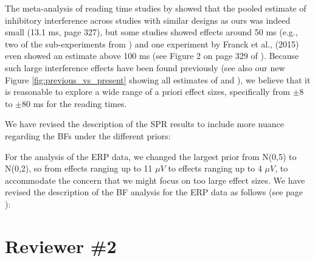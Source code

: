 \documentclass[12pt]{article}
\begin{document}
The meta-analysis of reading time studies by \textcite{jaeger_etal_2017} showed that the pooled estimate of inhibitory interference across studies with similar designs as ours was indeed small (13.1 ms, page 327), but some studies showed effects around 50 ms (e.g., two of the sub-experiments from \cite{vandyke07}) and one experiment by Franck et al., (2015) even showed an estimate above 100 ms (see Figure 2 on page 329 of \cite{jaeger_etal_2017}). Because such large interference effects have been found previously (see also our new Figure \ref{fig:previous_vs_present} showing all estimates of \cite{vandyke07} and \cite{mertzen}), we believe that it is reasonable to explore a wide range of a priori effect sizes, specifically from $\pm$8 to $\pm$80 ms for the reading times. 

We have revised the description of the SPR results to include more nuance regarding the BFs under the different priors:

\setcounter{figure}{4}
\begin{quote}
\end{quote}

For the analysis of the ERP data, we changed the largest prior from N(0,5) to N(0,2), so from effects ranging up to 11 $\mu V$ to effects ranging up to 4 $\mu V$, to accommodate the concern that we might focus on too large effect sizes. We have revised the description of the BF analysis for the ERP data as follows (see page \pageref{ERP_results3}):

\begin{quote}
\end{quote}

\section*{Reviewer \#2} 
\end{document}
